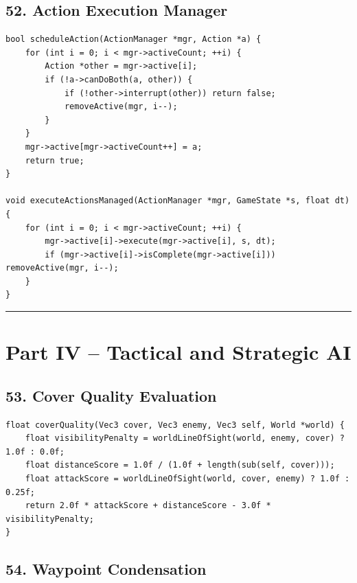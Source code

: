 \documentclass[10pt,letterpaper]{article}
\begin{document}
\subsection*{52. Action Execution Manager}
{}

\begin{verbatim}
bool scheduleAction(ActionManager *mgr, Action *a) {
    for (int i = 0; i < mgr->activeCount; ++i) {
        Action *other = mgr->active[i];
        if (!a->canDoBoth(a, other)) {
            if (!other->interrupt(other)) return false;
            removeActive(mgr, i--);
        }
    }
    mgr->active[mgr->activeCount++] = a;
    return true;
}

void executeActionsManaged(ActionManager *mgr, GameState *s, float dt) {
    for (int i = 0; i < mgr->activeCount; ++i) {
        mgr->active[i]->execute(mgr->active[i], s, dt);
        if (mgr->active[i]->isComplete(mgr->active[i])) removeActive(mgr, i--);
    }
}
\end{verbatim}

\medskip\hrule\medskip

\clearpage
\section*{Part IV -- Tactical and Strategic AI}

\subsection*{53. Cover Quality Evaluation}
{}

\begin{verbatim}
float coverQuality(Vec3 cover, Vec3 enemy, Vec3 self, World *world) {
    float visibilityPenalty = worldLineOfSight(world, enemy, cover) ? 1.0f : 0.0f;
    float distanceScore = 1.0f / (1.0f + length(sub(self, cover)));
    float attackScore = worldLineOfSight(world, cover, enemy) ? 1.0f : 0.25f;
    return 2.0f * attackScore + distanceScore - 3.0f * visibilityPenalty;
}
\end{verbatim}

\subsection*{54. Waypoint Condensation}
{}
\end{document}
